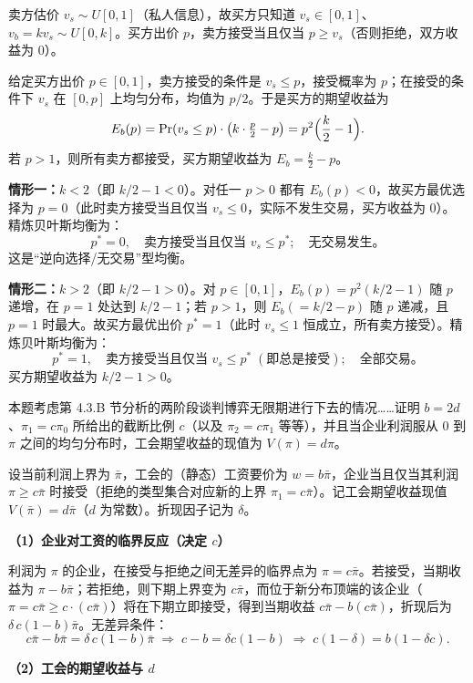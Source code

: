 \sol 卖方估价 $v_s\sim U[0,1]$（私人信息），故买方只知道 $v_s\in[0,1]$、$v_b=kv_s\sim U[0,k]$。买方出价 $p$，卖方接受当且仅当 $p\ge v_s$（否则拒绝，双方收益为 $0$）。

给定买方出价 $p\in[0,1]$，卖方接受的条件是 $v_s\le p$，接受概率为 $p$；在接受的条件下 $v_s$ 在 $[0,p]$ 上均匀分布，均值为 $p/2$。于是买方的期望收益为
\[
  E_b(p)=\Pr(v_s\le p)\cdot\bigl(k\cdot\tfrac{p}{2}-p\bigr)
        =p^2\Bigl(\frac{k}{2}-1\Bigr).
\]\indent
若 $p>1$，则所有卖方都接受，买方期望收益为 $E_b=\frac{k}{2}-p$。

\textbf{情形一：$k<2$}（即 $k/2-1<0$）。对任一 $p>0$ 都有 $E_b(p)<0$，故买方最优选择为 $p=0$（此时卖方接受当且仅当 $v_s\le0$，实际不发生交易，买方收益为 $0$）。精炼贝叶斯均衡为：
\[
  \boxed{\;p^*=0,\quad \text{卖方接受当且仅当 }v_s\le p^*;\quad \text{无交易发生。}\;}
\]\indent
这是“逆向选择/无交易”型均衡。

\textbf{情形二：$k>2$}（即 $k/2-1>0$）。对 $p\in[0,1]$，$E_b(p)=p^2(k/2-1)$ 随 $p$ 递增，在 $p=1$ 处达到 $k/2-1$；若 $p>1$，则 $E_b(=k/2-p)$ 随 $p$ 递减，且 $p=1$ 时最大。故买方最优出价 $p^*=1$（此时 $v_s\le1$ 恒成立，所有卖方接受）。精炼贝叶斯均衡为：
\[
  \boxed{\;p^*=1,\quad \text{卖方接受当且仅当 }v_s\le p^*\;(\text{即总是接受});\quad \text{全部交易。}\;}
\]\indent
买方期望收益为 $k/2-1>0$。

本题考虑第 4.3.B 节分析的两阶段谈判博弈无限期进行下去的情况……证明 $b=2d$、$\pi_1=c\pi_0$ 所给出的截断比例 $c$（以及 $\pi_2=c\pi_1$ 等等），并且当企业利润服从 $0$ 到 $\pi$ 之间的均匀分布时，工会期望收益的现值为 $V(\pi)=d\pi$。

\sol 设当前利润上界为 $\bar\pi$，工会的（静态）工资要价为 $w=b\bar\pi$，企业当且仅当其利润 $\pi\ge c\bar\pi$ 时接受（拒绝的类型集合对应新的上界 $\pi_1=c\bar\pi$）。记工会期望收益现值 $V(\bar\pi)=d\bar\pi$（$d$ 为常数）。折现因子记为 $\delta$。

\textbf{（1）企业对工资的临界反应（决定 $c$）}

利润为 $\pi$ 的企业，在接受与拒绝之间无差异的临界点为 $\pi=c\bar\pi$。若接受，当期收益为 $\pi-b\bar\pi$；若拒绝，则下期上界变为 $c\bar\pi$，而位于新分布顶端的该企业（$\pi=c\bar\pi\ge c\cdot(c\bar\pi)$）将在下期立即接受，得到当期收益 $c\bar\pi-b(c\bar\pi)$，折现后为 $\delta\,c(1-b)\bar\pi$。无差异条件：
\[
  c\bar\pi-b\bar\pi=\delta\,c(1-b)\bar\pi
  \;\Longrightarrow\;
  c-b=\delta c(1-b)
  \;\Longrightarrow\;
  c(1-\delta)=b(1-\delta c). \tag{1}
\]

\textbf{（2）工会的期望收益与 $d$}


